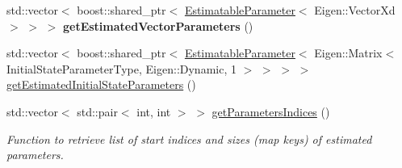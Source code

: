 \begin{DoxyCompactItemize}
\item 
std\+::vector$<$ boost\+::shared\+\_\+ptr$<$ \hyperlink{classtudat_1_1estimatable__parameters_1_1EstimatableParameter}{Estimatable\+Parameter}$<$ Eigen\+::\+Vector\+Xd $>$ $>$ $>$ {\bfseries get\+Estimated\+Vector\+Parameters} ()\hypertarget{classtudat_1_1estimatable__parameters_1_1EstimatableParameterSet_ac3d0dce1ab83e060d59e4c7a9f8848ec}{}\label{classtudat_1_1estimatable__parameters_1_1EstimatableParameterSet_ac3d0dce1ab83e060d59e4c7a9f8848ec}

\item 
std\+::vector$<$ boost\+::shared\+\_\+ptr$<$ \hyperlink{classtudat_1_1estimatable__parameters_1_1EstimatableParameter}{Estimatable\+Parameter}$<$ Eigen\+::\+Matrix$<$ Initial\+State\+Parameter\+Type, Eigen\+::\+Dynamic, 1 $>$ $>$ $>$ $>$ \hyperlink{classtudat_1_1estimatable__parameters_1_1EstimatableParameterSet_af23de084b2d68a3e6c78903686bf59fd}{get\+Estimated\+Initial\+State\+Parameters} ()
\item 
std\+::vector$<$ std\+::pair$<$ int, int $>$ $>$ \hyperlink{classtudat_1_1estimatable__parameters_1_1EstimatableParameterSet_adf82a225dfa7891cd6bc1486b3750c36}{get\+Parameters\+Indices} ()
\begin{DoxyCompactList}\small\item\em Function to retrieve list of start indices and sizes (map keys) of estimated parameters. \end{DoxyCompactList}\end{DoxyCompactItemize}
